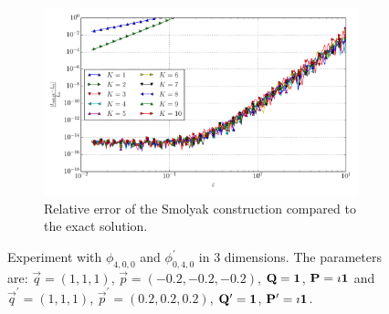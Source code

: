 \documentclass[a4paper,10pt]{article}
\begin{document}
\begin{figure}[ht!]
\begin{subfigure}[t]{0.5\linewidth}
    \includegraphics[width=\linewidth]{./plots/tp_sg_3d_conv_eps_(4,0,0)_(0,4,0)_err_rel_nsd_gk.pdf}
    \caption{Relative error of the Smolyak construction compared to the exact solution.}
    \label{fig:tp_sg_3d_conv_p_400_040_err_rel_nsd_gk}
  \end{subfigure}
  \label{fig:tp_sg_3d_conv_p_400_040}
  \caption{Experiment with $\phi_{4,0,0}$ and $\phi_{0,4,0}^{\prime}$
  in 3 dimensions.
  The parameters are:
  $\vec{q} = (1, 1, 1)$,
  $\vec{p} = (-0.2, -0.2, -0.2)$,
  $\mathbf{Q} = \mathbf{1}$,
  $\mathbf{P} = \imath \mathbf{1}$
  and
  $\vec{q}^\prime = (1, 1, 1)$,
  $\vec{p}^\prime = (0.2, 0.2, 0.2)$,
  $\mathbf{Q}^\prime = \mathbf{1}$,
  $\mathbf{P}^\prime = \imath \mathbf{1}$.}
\end{figure}
\end{document}
